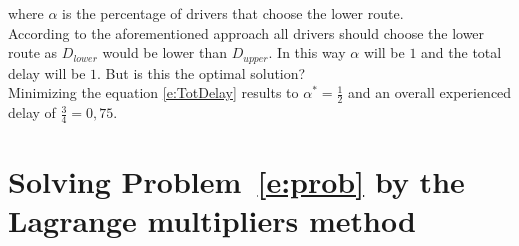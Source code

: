 where $\alpha$ is the percentage of drivers that choose the lower route.\\
According to the aforementioned approach all drivers should choose the lower route as $D_{lower}$ would be lower than  $D_{upper}$. In this way $\alpha$ will be $1$ and the total delay will be $1$. But is this the optimal solution? \\
Minimizing the equation \eqref{e:TotDelay}  results to $\alpha^*=\frac{1}{2}$ and an overall experienced delay of $\frac{3}{4}= 0,75$. 



\section{Solving Problem~\eqref{e:prob} by the Lagrange multipliers method}

